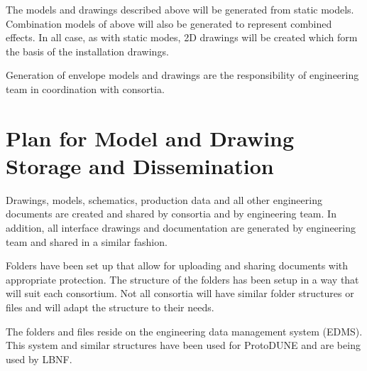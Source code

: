 The models and drawings described above will be generated from static
models. Combination models of above will also be generated to
represent combined effects. In all case, as with static modes, 2D
drawings will be created which form the basis of the installation
drawings.

Generation of envelope models and drawings are the responsibility of
 engineering team in coordination with consortia.


\section{Plan for Model and Drawing Storage and Dissemination}
\label{sec:fdsp-coord-integ-modelplan}
Drawings, models, schematics, production data and all other
engineering documents are created and shared by consortia and by
 engineering team. In addition, all interface drawings and
documentation are generated by  engineering team and shared
in a similar fashion.

Folders have been set up that allow for uploading and sharing
documents with appropriate protection. The structure of the folders
has been setup in a way that will suit each consortium. Not all
consortia will have similar folder structures or files and will adapt
the structure to their needs.

The folders and files reside on the engineering data management system
(EDMS). This system and similar structures have been used for
ProtoDUNE and are being used by LBNF.

